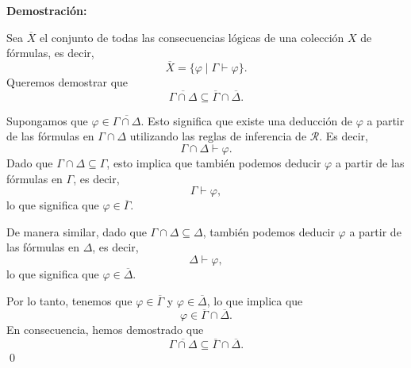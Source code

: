 \begin{solution}
\textbf{Demostración:}

Sea $\overline{X}$ el conjunto de todas las consecuencias lógicas de una colección $X$ de fórmulas, es decir, 
\[
\overline{X} = \{ \varphi \mid \Gamma \vdash \varphi \}.
\]
Queremos demostrar que 
\[
\overline{\Gamma \cap \Delta} \subseteq \overline{\Gamma} \cap \overline{\Delta}.
\]

Supongamos que $\varphi \in \overline{\Gamma \cap \Delta}$. Esto significa que existe una deducción de $\varphi$ a partir de las fórmulas en $\Gamma \cap \Delta$ utilizando las reglas de inferencia de $\mathscr{R}$. Es decir,
\[
\Gamma \cap \Delta \vdash \varphi.
\]
Dado que $\Gamma \cap \Delta \subseteq \Gamma$, esto implica que también podemos deducir $\varphi$ a partir de las fórmulas en $\Gamma$, es decir,
\[
\Gamma \vdash \varphi,
\]
lo que significa que $\varphi \in \overline{\Gamma}$.

De manera similar, dado que $\Gamma \cap \Delta \subseteq \Delta$, también podemos deducir $\varphi$ a partir de las fórmulas en $\Delta$, es decir,
\[
\Delta \vdash \varphi,
\]
lo que significa que $\varphi \in \overline{\Delta}$.

Por lo tanto, tenemos que $\varphi \in \overline{\Gamma}$ y $\varphi \in \overline{\Delta}$, lo que implica que 
\[
\varphi \in \overline{\Gamma} \cap \overline{\Delta}.
\]
En consecuencia, hemos demostrado que 
\[
\overline{\Gamma \cap \Delta} \subseteq \overline{\Gamma} \cap \overline{\Delta}.
\]
\qed

\end{solution}